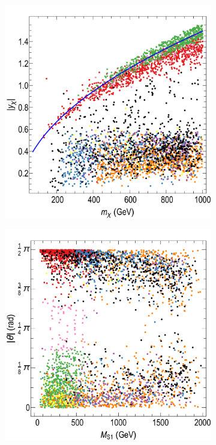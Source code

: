 \begin{figure}[t]
\centering
\begin{subfigure}[t]{0.43\textwidth}
\includegraphics[width=\textwidth]{texinputs/05_relic/figures/relic_scalar/mDM_yDM4.pdf}
\label{fig:scan1a}
\end{subfigure}
\hspace{1em}
\begin{subfigure}[t]{0.43\textwidth}
\includegraphics[width=\textwidth]{texinputs/05_relic/figures/relic_scalar/MS1_Theta2.pdf}

\end{subfigure}
\end{figure}
